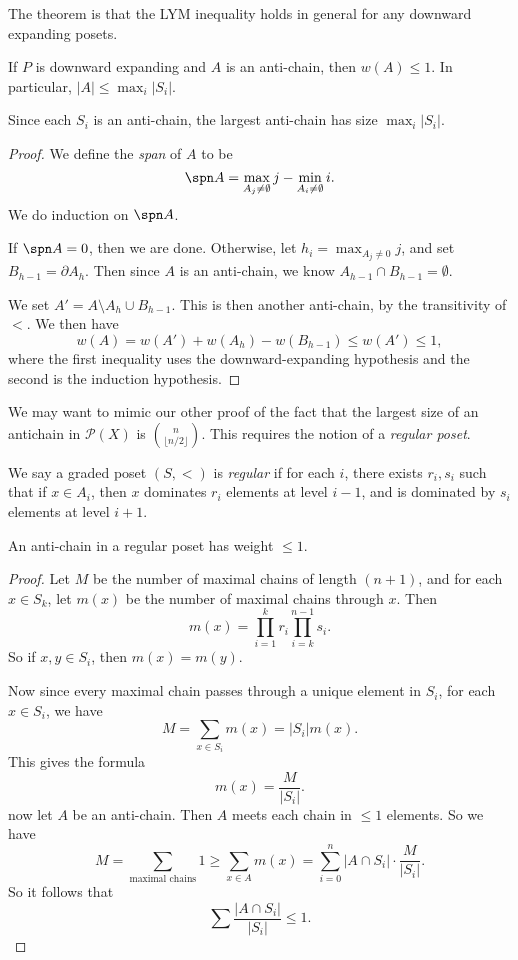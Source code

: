 \documentclass[a4paper]{article}
\begin{document}
The theorem is that the LYM inequality holds in general for any downward expanding posets.
\begin{thm}
  If $P$ is downward expanding and $A$ is an anti-chain, then $w(A) \leq 1$. In particular, $|A| \leq \max_i |S_i|$.

  Since each $S_i$ is an anti-chain, the largest anti-chain has size $\max_i |S_i|$.
\end{thm}

\begin{proof}
  We define the \emph{span} of $A$ to be
  \[
    \spn A = \max_{A_j \not= \emptyset} j - \min_{A_i \not= \emptyset} i.
  \]
  We do induction on $\spn A$.

  If $\spn A = 0$, then we are done. Otherwise, let $h_i = \max_{A_j \not= 0} j$, and set $B_{h - 1} = \partial A_h$. Then since $A$ is an anti-chain, we know $A_{h - 1} \cap B_{h - 1} = \emptyset$.

  We set $A' = A \setminus A_h \cup B_{h - 1}$. This is then another anti-chain, by the transitivity of $<$. We then have
  \[
    w(A) = w(A') + w(A_h) - w(B_{h - 1}) \leq w(A') \leq 1,
  \]
  where the first inequality uses the downward-expanding hypothesis and the second is the induction hypothesis.
\end{proof}

We may want to mimic our other proof of the fact that the largest size of an antichain in $\mathcal{P}(X)$ is $\binom{n}{\lfloor n/2\rfloor}$. This requires the notion of a \emph{regular poset}.

\begin{defi}
  We say a graded poset $(S, <)$ is \emph{regular} if for each $i$, there exists $r_i, s_i$ such that if $x \in A_i$, then $x$ dominates $r_i$ elements at level $i - 1$, and is dominated by $s_i$ elements at level $i + 1$.
\end{defi}

\begin{prop}
  An anti-chain in a regular poset has weight $\leq 1$.
\end{prop}

\begin{proof}
  Let $M$ be the number of maximal chains of length $(n + 1)$, and for each $x \in S_k$, let $m(x)$ be the number of maximal chains through $x$. Then
  \[
    m(x) = \prod_{i = 1}^k r_i \prod_{i = k}^{n - 1} s_i.
  \]
  So if $x, y \in S_i$, then $m(x) = m(y)$.

  Now since every maximal chain passes through a unique element in $S_i$, for each $x \in S_i$, we have
  \[
    M = \sum_{x \in S_i} m(x) = |S_i| m(x).
  \]
  This gives the formula
  \[
    m(x) = \frac{M}{|S_i|}.
  \]
  now let $A$ be an anti-chain. Then $A$ meets each chain in $\leq 1$ elements. So we have
  \[
    M = \sum_{\text{maximal chains}} 1 \geq \sum_{x \in A} m(x) = \sum_{i = 0}^n |A \cap S_i| \cdot \frac{M}{|S_i|}.
  \]
  So it follows that
  \[
    \sum \frac{|A \cap S_i|}{|S_i|} \leq 1.
  \]
\end{proof}
\end{document}
